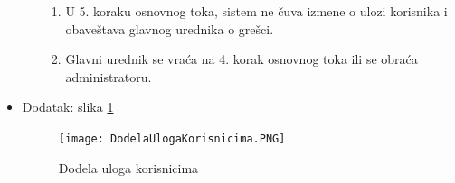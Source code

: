 \documentclass[a4paper]{article}
\begin{document}
\begin{itemize}
\begin{enumerate}
\begin{enumerate}
                \item U 5. koraku osnovnog toka, sistem ne čuva izmene o ulozi korisnika i obaveštava glavnog urednika o grešci.
                \item Glavni urednik se vraća na 4. korak osnovnog toka ili se obraća administratoru.
            \end{enumerate}
        \end{enumerate}
        \item Dodatak: slika \ref{fig:uloge}
\begin{figure}[ht!]
    \centering
    \texttt{[image: DodelaUlogaKorisnicima.PNG]}
    \caption{Dodela uloga korisnicima \cite{smalkov} \cite{vparadigm}}
    \label{fig:uloge}
\end{figure}
\end{itemize}

\newpage
\end{document}
